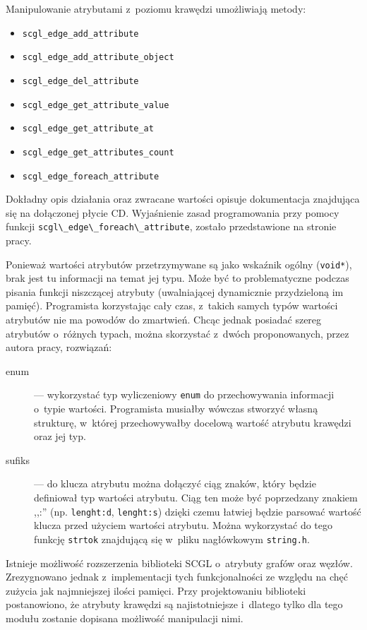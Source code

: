 \documentclass[a4paper,12pt,polish,twoside,openright]{thesis}
\newcommand\code[1]{\lstinline[style=line]{#1}}
\begin{document}
Manipulowanie atrybutami z~poziomu krawędzi umożliwiają metody:
\begin{itemize}
	\item \code{scgl_edge_add_attribute}
	\item \code{scgl_edge_add_attribute_object}
	\item \code{scgl_edge_del_attribute}
	\item \code{scgl_edge_get_attribute_value}
	\item \code{scgl_edge_get_attribute_at}
	\item \code{scgl_edge_get_attributes_count}
	\item \code{scgl_edge_foreach_attribute}
\end{itemize}
Dokładny opis działania oraz zwracane wartości opisuje dokumentacja znajdująca się na dołączonej płycie CD. Wyjaśnienie zasad programowania przy pomocy funkcji \code{scgl\_edge\_foreach\_attribute}, zostało przedstawione na stronie \pageref{sec:foreach} pracy.

Ponieważ wartości atrybutów przetrzymywane są jako wskaźnik ogólny (\code{void*}), brak jest tu informacji na temat jej typu.
Może być to problematyczne podczas pisania funkcji niszczącej atrybuty (uwalniającej dynamicznie przydzieloną im pamięć).
Programista korzystając cały czas, z~takich samych typów wartości atrybutów nie ma powodów do zmartwień.
Chcąc jednak posiadać szereg atrybutów o~różnych typach, można skorzystać z~dwóch proponowanych, przez autora pracy, rozwiązań:
\begin{description}
	\item[enum] --- wykorzystać typ wyliczeniowy \code{enum} do przechowywania informacji o~typie wartości.
	Programista musiałby wówczas stworzyć własną strukturę, w~której przechowywałby docelową wartość atrybutu krawędzi oraz jej typ.
	\item[sufiks] --- do klucza atrybutu można dołączyć ciąg znaków, który będzie definiował typ wartości atrybutu.
	Ciąg ten może być poprzedzany znakiem ,,:'' (np. \code{lenght:d}, \code{lenght:s}) dzięki czemu łatwiej będzie parsować wartość klucza przed użyciem wartości atrybutu.
	Można wykorzystać do tego funkcję \code{strtok} znajdującą się w~pliku nagłówkowym \code{string.h}.
\end{description}

Istnieje możliwość rozszerzenia biblioteki SCGL o~atrybuty grafów oraz węzłów.
Zrezygnowano jednak z~implementacji tych funkcjonalności ze względu na chęć zużycia jak najmniejszej ilości pamięci.
Przy projektowaniu biblioteki postanowiono, że atrybuty krawędzi są najistotniejsze i~dlatego tylko dla tego modułu zostanie dopisana możliwość manipulacji nimi.
\end{document}
